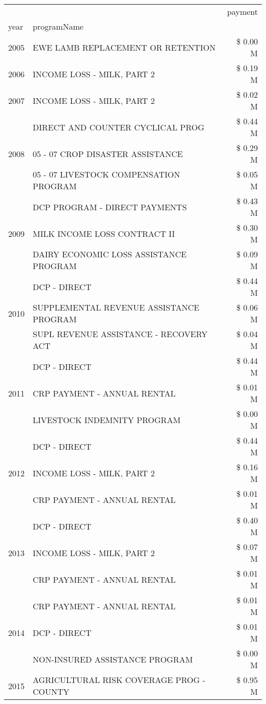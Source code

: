 \begin{tabular}{llr}
\toprule
 &  & payment \\
year & programName &  \\
\midrule
2005 & EWE LAMB REPLACEMENT OR RETENTION & \$ 0.00 M \\
\cline{1-3}
2006 & INCOME LOSS - MILK, PART 2 & \$ 0.19 M \\
\cline{1-3}
2007 & INCOME LOSS - MILK, PART 2 & \$ 0.02 M \\
\cline{1-3}
\multirow[t]{3}{*}{2008} & DIRECT AND COUNTER CYCLICAL PROG & \$ 0.44 M \\
 & 05 - 07 CROP DISASTER ASSISTANCE & \$ 0.29 M \\
 & 05 - 07 LIVESTOCK COMPENSATION PROGRAM & \$ 0.05 M \\
\cline{1-3}
\multirow[t]{3}{*}{2009} & DCP PROGRAM - DIRECT PAYMENTS & \$ 0.43 M \\
 & MILK INCOME LOSS CONTRACT II & \$ 0.30 M \\
 & DAIRY ECONOMIC LOSS ASSISTANCE PROGRAM & \$ 0.09 M \\
\cline{1-3}
\multirow[t]{3}{*}{2010} & DCP - DIRECT & \$ 0.44 M \\
 & SUPPLEMENTAL REVENUE ASSISTANCE PROGRAM & \$ 0.06 M \\
 & SUPL REVENUE ASSISTANCE - RECOVERY ACT & \$ 0.04 M \\
\cline{1-3}
\multirow[t]{3}{*}{2011} & DCP - DIRECT & \$ 0.44 M \\
 & CRP PAYMENT - ANNUAL RENTAL & \$ 0.01 M \\
 & LIVESTOCK INDEMNITY PROGRAM & \$ 0.00 M \\
\cline{1-3}
\multirow[t]{3}{*}{2012} & DCP - DIRECT & \$ 0.44 M \\
 & INCOME LOSS - MILK, PART 2 & \$ 0.16 M \\
 & CRP PAYMENT - ANNUAL RENTAL & \$ 0.01 M \\
\cline{1-3}
\multirow[t]{3}{*}{2013} & DCP - DIRECT & \$ 0.40 M \\
 & INCOME LOSS - MILK, PART 2 & \$ 0.07 M \\
 & CRP PAYMENT - ANNUAL RENTAL & \$ 0.01 M \\
\cline{1-3}
\multirow[t]{3}{*}{2014} & CRP PAYMENT - ANNUAL RENTAL & \$ 0.01 M \\
 & DCP - DIRECT & \$ 0.01 M \\
 & NON-INSURED ASSISTANCE PROGRAM & \$ 0.00 M \\
\cline{1-3}
\multirow[t]{3}{*}{2015} & AGRICULTURAL RISK COVERAGE PROG - COUNTY & \$ 0.95 M \\

\end{tabular}
